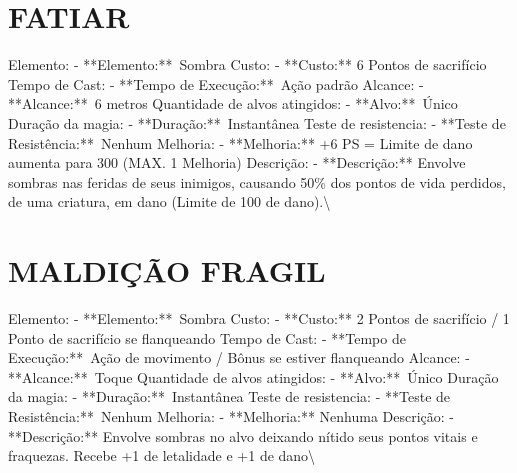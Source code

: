 \documentclass{article}%
\begin{document}
%
\section{FATIAR}%
\label{sec:FATIAR}%
Elemento: {-} **Elemento:**~Sombra\newline%
Custo: {-} **Custo:** 6 Pontos de sacrifício\newline%
Tempo de Cast: {-} **Tempo de Execução:**~Ação padrão\newline%
Alcance: {-} **Alcance:**~6 metros\newline%
Quantidade de alvos atingidos: {-} **Alvo:**~Único\newline%
Duração da magia: {-} **Duração:**~Instantânea\newline%
Teste de resistencia: {-} **Teste de Resistência:**~Nenhum\newline%
Melhoria: {-} **Melhoria:** +6 PS = Limite de dano aumenta para 300 (MAX. 1 Melhoria)\newline%
Descrição: {-} **Descrição:** Envolve sombras nas feridas de seus inimigos, causando 50\% dos pontos de vida perdidos, de uma criatura, em dano (Limite de 100 de dano).\textbackslash{}

%
\section{MALDIÇÃO FRAGIL}%
\label{sec:MALDIOFRAGIL}%
Elemento: {-} **Elemento:**~Sombra\newline%
Custo: {-} **Custo:** 2 Pontos de sacrifício / 1 Ponto de sacrifício se flanqueando\newline%
Tempo de Cast: {-} **Tempo de Execução:**~Ação de movimento / Bônus se estiver flanqueando\newline%
Alcance: {-} **Alcance:**~Toque\newline%
Quantidade de alvos atingidos: {-} **Alvo:**~Único\newline%
Duração da magia: {-} **Duração:**~Instantânea\newline%
Teste de resistencia: {-} **Teste de Resistência:**~Nenhum\newline%
Melhoria: {-} **Melhoria:** Nenhuma\newline%
Descrição: {-} **Descrição:** Envolve sombras no alvo deixando nítido seus pontos vitais e fraquezas. Recebe +1 de letalidade e +1 de dano\textbackslash{}

%
\end{document}
